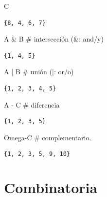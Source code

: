 \documentclass[
  letterpaper,
  DIV=11,
  numbers=noendperiod]{scrreprt}
\newenvironment{Shaded}{\begin{snugshade}}{\end{snugshade}}
\newcommand{\CommentTok}[1]{\textcolor[rgb]{0.37,0.37,0.37}{#1}}
\newcommand{\NormalTok}[1]{\textcolor[rgb]{0.00,0.23,0.31}{#1}}
\newcommand{\OperatorTok}[1]{\textcolor[rgb]{0.37,0.37,0.37}{#1}}
\begin{document}
\begin{Shaded}
\begin{Highlighting}[]
\NormalTok{C}
\end{Highlighting}
\end{Shaded}

\begin{verbatim}
{8, 4, 6, 7}
\end{verbatim}

\begin{Shaded}
\begin{Highlighting}[]
\NormalTok{A }\OperatorTok{\&}\NormalTok{ B   }\CommentTok{\# intersección (\&: and/y)}
\end{Highlighting}
\end{Shaded}

\begin{verbatim}
{1, 4, 5}
\end{verbatim}

\begin{Shaded}
\begin{Highlighting}[]
\NormalTok{A }\OperatorTok{|}\NormalTok{ B   }\CommentTok{\# unión (|: or/o)}
\end{Highlighting}
\end{Shaded}

\begin{verbatim}
{1, 2, 3, 4, 5}
\end{verbatim}

\begin{Shaded}
\begin{Highlighting}[]
\NormalTok{A }\OperatorTok{{-}}\NormalTok{ C   }\CommentTok{\# diferencia }
\end{Highlighting}
\end{Shaded}

\begin{verbatim}
{1, 2, 3, 5}
\end{verbatim}

\begin{Shaded}
\begin{Highlighting}[]
\NormalTok{Omega}\OperatorTok{{-}}\NormalTok{C }\CommentTok{\# complementario.}
\end{Highlighting}
\end{Shaded}

\begin{verbatim}
{1, 2, 3, 5, 9, 10}
\end{verbatim}

\section{Combinatoria}\label{combinatoria}
\end{document}
